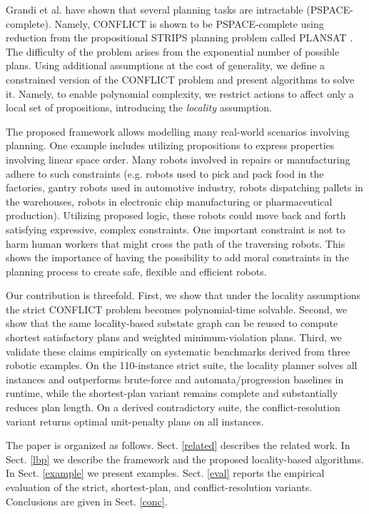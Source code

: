 \documentclass[]{jair}
\begin{document}
Grandi et al. \cite{grandi2022logic} have shown that several planning tasks are intractable (PSPACE-complete). Namely, CONFLICT is shown to be PSPACE-complete using reduction from the propositional STRIPS planning problem called PLANSAT \cite{BYLANDER1994165}. The difficulty of the problem arises from the exponential number of possible plans.
Using additional assumptions at the cost of generality, we define a constrained version of the CONFLICT problem and present algorithms to solve it. Namely, to enable polynomial complexity, we restrict actions to affect only a local set of propositions, introducing the {\it locality} assumption. 

The proposed framework allows modelling many real-world scenarios involving planning. One example includes utilizing propositions to express properties involving linear space order. Many robots involved in repairs or manufacturing adhere to such constraints (e.g. robots used to pick and pack food in the factories, gantry robots used in automotive industry, robots dispatching pallets in the warehouses, robots in electronic chip manufacturing or pharmaceutical production). Utilizing proposed logic, these robots could move back and forth satisfying expressive, complex constraints. One important constraint is not to harm human workers that might cross the path of the traversing robots. This shows the importance of having the possibility to add moral constraints in the planning process  to create safe, flexible and efficient robots.    

Our contribution is threefold. First, we show that under the locality assumptions the strict CONFLICT problem becomes polynomial-time solvable. Second, we show that the same locality-based substate graph can be reused to compute shortest satisfactory plans and weighted minimum-violation plans. Third, we validate these claims empirically on systematic benchmarks derived from three robotic examples. On the 110-instance strict suite, the locality planner solves all instances and outperforms brute-force and automata/progression baselines in runtime, while the shortest-plan variant remains complete and substantially reduces plan length. On a derived contradictory suite, the conflict-resolution variant returns optimal unit-penalty plans on all instances.

The paper is organized as follows. Sect. \ref{related} describes the related work. In Sect. \ref{lbp} we describe the framework and the proposed locality-based algorithms. In Sect. \ref{example} we present examples. Sect. \ref{eval} reports the empirical evaluation of the strict, shortest-plan, and conflict-resolution variants. Conclusions are given in Sect. \ref{conc}.
\end{document}
